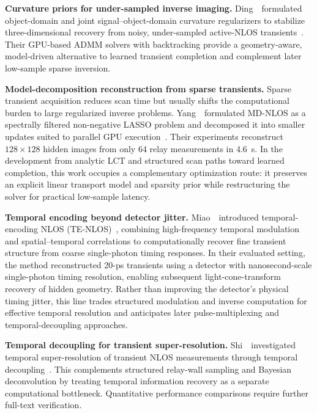 \vspace{0.8mm}
\noindent \textbf{Curvature priors for under-sampled inverse imaging.}
Ding~\etal~formulated object-domain and joint signal--object-domain curvature regularizers to stabilize three-dimensional recovery from noisy, under-sampled active-NLOS transients~\cite{dingCurvatureRegularizationNLOS2024}. Their GPU-based ADMM solvers with backtracking provide a geometry-aware, model-driven alternative to learned transient completion and complement later low-sample sparse inversion.

\vspace{0.8mm}
\noindent \textbf{Model-decomposition reconstruction from sparse transients.}
Sparse transient acquisition reduces scan time but usually shifts the computational burden to large regularized inverse problems. Yang~\etal~formulated MD-NLOS as a spectrally filtered non-negative LASSO problem and decomposed it into smaller updates suited to parallel GPU execution~\cite{yangModelDecompositionNLOS2026}. Their experiments reconstruct $128\times128$ hidden images from only 64 relay measurements in 4.6~s. In the development from analytic LCT and structured scan paths toward learned completion, this work occupies a complementary optimization route: it preserves an explicit linear transport model and sparsity prior while restructuring the solver for practical low-sample latency.

\vspace{0.8mm}
\vspace{0.8mm}
\noindent \textbf{Temporal encoding beyond detector jitter.}
Miao~\etal~introduced temporal-encoding NLOS (TE-NLOS)~\cite{miaoTemporalEncodingNLOS2023}, combining high-frequency temporal modulation and spatial--temporal correlations to computationally recover fine transient structure from coarse single-photon timing responses. In their evaluated setting, the method reconstructed 20-ps transients using a detector with nanosecond-scale single-photon timing resolution, enabling subsequent light-cone-transform recovery of hidden geometry. Rather than improving the detector's physical timing jitter, this line trades structured modulation and inverse computation for effective temporal resolution and anticipates later pulse-multiplexing and temporal-decoupling approaches.

\noindent \textbf{Temporal decoupling for transient super-resolution.}
Shi~\etal~investigated temporal super-resolution of transient NLOS measurements through temporal decoupling~\cite{shiTemporalDecouplingNLOS2026}. This complements structured relay-wall sampling and Bayesian deconvolution by treating temporal information recovery as a separate computational bottleneck. Quantitative performance comparisons require further full-text verification.

